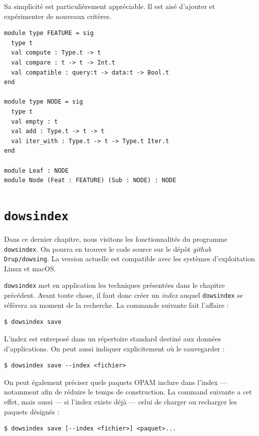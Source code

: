 \documentclass[a4paper]{report}
\theoremstyle{definition}
\newcommand{\dowsindex}{\texttt{dowsindex}\xspace}
\begin{document}
{Sa simplicité est particulièrement appréciable. Il est aisé d'ajouter et expérimenter de nouveaux critères.

\begin{verbatim}
module type FEATURE = sig
  type t
  val compute : Type.t -> t
  val compare : t -> t -> Int.t
  val compatible : query:t -> data:t -> Bool.t
end

module type NODE = sig
  type t
  val empty : t
  val add : Type.t -> t -> t
  val iter_with : Type.t -> t -> Type.t Iter.t
end

module Leaf : NODE
module Node (Feat : FEATURE) (Sub : NODE) : NODE
\end{verbatim}


\chapter{\dowsindex}

Dans ce dernier chapitre, nous visitons les fonctionnalités du programme \dowsindex. On pourra en trouver le code source sur le dépôt \textit{github} \texttt{Drup/dowsing}. La version actuelle est compatible avec les systèmes d'exploitation Linux et macOS.

\dowsindex met en application les techniques présentées dans le chapitre précédent. Avant toute chose, il faut donc créer un \emph{index} auquel \dowsindex se référera au moment de la recherche. La commande suivante fait l'affaire :

\begin{verbatim}
$ dowsindex save
\end{verbatim}

L'index est entreposé dans un répertoire standard destiné aux données d'applications. On peut aussi indiquer explicitement où le sauvegarder :

\begin{verbatim}
$ dowsindex save --index <fichier>
\end{verbatim}

On peut également préciser quels paquets OPAM inclure dans l'index — notamment afin de réduire le temps de construction. La command suivante a cet effet, mais aussi — si l'index existe déjà — celui de charger ou recharger les paquets désignés :

\begin{verbatim}
$ dowsindex save [--index <fichier>] <paquet>...
\end{verbatim}

}
\end{document}
